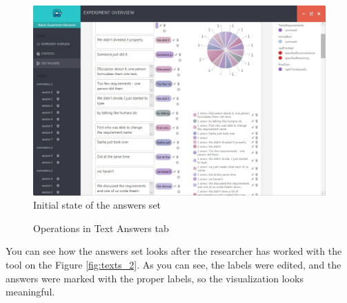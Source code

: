   \begin{figure}[htb]
 \centering
\includegraphics[width=370pt]{figures/texts_1.jpg}
\caption{Initial state of the answers set}
\label{fig:texts_1}
 \end{figure}

 
 \begin{figure}
  \centering 

    
  \caption{Operations in Text Answers tab}
  \label{fig:texts_3}
\end{figure}
 
 You can see how the answers set looks after the researcher has worked with the tool on the Figure \ref{fig:texts_2}. As you can see, the labels were edited, and the answers were marked with the proper labels, so the visualization looks meaningful. \\
 
